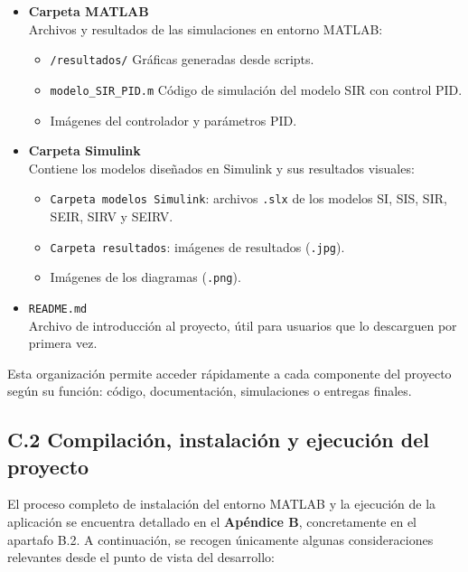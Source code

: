 \begin{itemize}
    \item \textbf{Carpeta MATLAB} \\
    Archivos y resultados de las simulaciones en entorno MATLAB:
    \begin{itemize}
        \item \texttt{/resultados/} \hfill Gráficas generadas desde scripts.
        \item \texttt{modelo\_SIR\_PID.m} \hfill Código de simulación del modelo SIR con control PID.
        \item Imágenes del controlador y parámetros PID.
    \end{itemize}

    \item \textbf{Carpeta Simulink} \\
    Contiene los modelos diseñados en Simulink y sus resultados visuales:
    \begin{itemize}
        \item \texttt{Carpeta modelos Simulink}: archivos \texttt{.slx} de los modelos SI, SIS, SIR, SEIR, SIRV y SEIRV.
        \item \texttt{Carpeta resultados}: imágenes de resultados (\texttt{.jpg}).
        \item Imágenes de los diagramas (\texttt{.png}).
    \end{itemize}

    \item \texttt{README.md} \\
    Archivo de introducción al proyecto, útil para usuarios que lo descarguen por primera vez.
\end{itemize}

Esta organización permite acceder rápidamente a cada componente del proyecto según su función: código, documentación, simulaciones o entregas finales.


\subsection{C.2 Compilación, instalación y ejecución del proyecto}

El proceso completo de instalación del entorno MATLAB y la ejecución de la aplicación se encuentra detallado en el \textbf{Apéndice B}, concretamente en el apartafo B.2. A continuación, se recogen únicamente algunas consideraciones relevantes desde el punto de vista del desarrollo:


